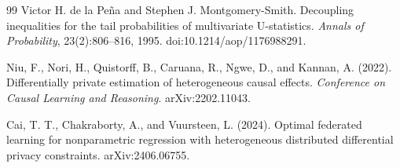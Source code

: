 \documentclass{article}
\begin{document}
\begin{thebibliography}{99}
   Victor H. de la Pe\~na and Stephen J. Montgomery-Smith. Decoupling inequalities for the tail probabilities of multivariate U-statistics. \emph{Annals of Probability}, 23(2):806--816, 1995. doi:10.1214/aop/1176988291.

   Niu, F., Nori, H., Quistorff, B., Caruana, R., Ngwe, D., and Kannan, A. (2022). Differentially private estimation of heterogeneous causal effects. \emph{Conference on Causal Learning and Reasoning}. arXiv:2202.11043.

   Cai, T. T., Chakraborty, A., and Vuursteen, L. (2024). Optimal federated learning for nonparametric regression with heterogeneous distributed differential privacy constraints. arXiv:2406.06755.

\end{thebibliography}
\end{document}
